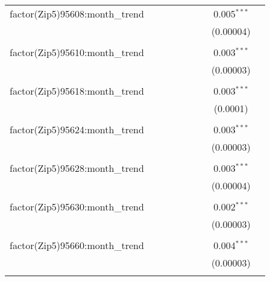 \begin{table}[H]
{\begin{tabular}{@{\extracolsep{5pt}}lcccccccc}
  factor(Zip5)95608:month\_trend &  &  &  &  &  &  & 0.005$^{***}$ &  \\  

   &  &  &  &  &  &  & (0.00004) &  \\  

   & & & & & & & & \\  

  factor(Zip5)95610:month\_trend &  &  &  &  &  &  & 0.003$^{***}$ &  \\  

   &  &  &  &  &  &  & (0.00003) &  \\  

   & & & & & & & & \\  

  factor(Zip5)95618:month\_trend &  &  &  &  &  &  & 0.003$^{***}$ &  \\  

   &  &  &  &  &  &  & (0.0001) &  \\  

   & & & & & & & & \\  

  factor(Zip5)95624:month\_trend &  &  &  &  &  &  & 0.003$^{***}$ &  \\  

   &  &  &  &  &  &  & (0.00003) &  \\  

   & & & & & & & & \\  

  factor(Zip5)95628:month\_trend &  &  &  &  &  &  & 0.003$^{***}$ &  \\  

   &  &  &  &  &  &  & (0.00004) &  \\  

   & & & & & & & & \\  

  factor(Zip5)95630:month\_trend &  &  &  &  &  &  & 0.002$^{***}$ &  \\  

   &  &  &  &  &  &  & (0.00003) &  \\  

   & & & & & & & & \\  

  factor(Zip5)95660:month\_trend &  &  &  &  &  &  & 0.004$^{***}$ &  \\  

   &  &  &  &  &  &  & (0.00003) &  \\  

   & & & & & & & & \\  


\end{tabular}}
\end{table}
